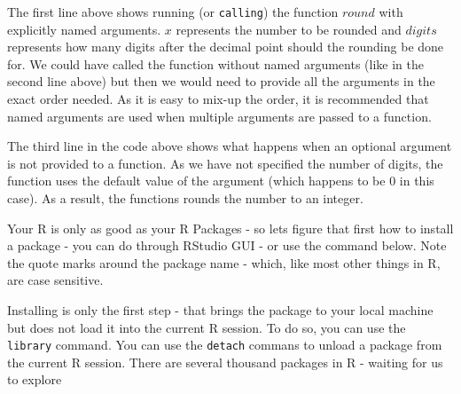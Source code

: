 \documentclass[10pt, letterpaper, twoside]{memoir}\usepackage{knitr}
\begin{document}
The first line above shows running (or \texttt{calling}) the function $round$  with explicitly named arguments. $x$ represents the number to be rounded and $digits$ represents how many digits after the decimal point should the rounding be done for. We could have called the function without named arguments (like in the second line above) but then we would need to provide all the arguments in the exact order needed. As it is easy to mix-up the order, it is recommended that named arguments are used when multiple arguments are passed to a function.

The third line in the code above shows what happens when an optional argument is not provided to a function. As we have not specified the number of digits, the function uses the default value of the argument (which happens to be $0$ in this case). As a result, the functions rounds the number to an integer.

Your R is only as good as your R Packages - so lets figure that first how to install a package - you can do through RStudio GUI - or use the command below. Note the quote marks around the package name - which, like most other things in R, are case sensitive.
\begin{knitrout}
\color{fgcolor}\begin{kframe}
\begin{alltt}
\hlstd{(}\hlstd{)}
\end{alltt}
\end{kframe}
\end{knitrout}

Installing is only the first step - that brings the package to your local machine but does not load it into the current R session. To do so, you can use the \texttt{library} command. You can use the \texttt{detach} commans to unload a package from the current R session. There are several thousand packages in R - waiting for us to explore
\begin{knitrout}
\color{fgcolor}\begin{kframe}
\begin{alltt}
\hlopt{:}
\end{alltt}
\end{kframe}
\end{knitrout}
\end{document}
